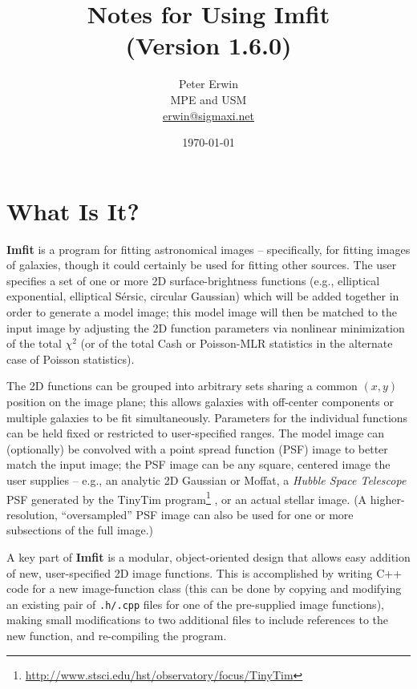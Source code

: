 \documentclass[10pt,a4paper,article]{memoir}
\newcommand{\imfit}{\textbf{Imfit}}
\newcommand{\Imfit}{\textbf{Imfit}}
\newcommand{\chisquare}{\ensuremath{\chi^{2}}}
\newcommand{\versionnum}{1.6.0}
\begin{document}
\title{
  Notes for Using Imfit \\
  (Version \versionnum{})
}
\author{
  Peter Erwin\\
  MPE and USM\\
  \href{mailto:erwin@sigmaxi.net}{erwin@sigmaxi.net}
}
\date{\today}  %

\maketitle

\tableofcontents


\newpage

\chapter{What Is It?}

\Imfit{} is a program for fitting astronomical images -- specifically,
for fitting images of galaxies, though it could certainly be used for
fitting other sources. The user specifies a set of one or more 2D
surface-brightness functions (e.g., elliptical exponential, elliptical
S\'ersic, circular Gaussian) which will be added together in order to
generate a model image; this model image will then be matched to the
input image by adjusting the 2D function parameters via nonlinear
minimization of the total \chisquare{} (or of the total Cash or
Poisson-MLR statistics in the alternate case of Poisson statistics).

The 2D functions can be grouped into arbitrary sets sharing a common $(x,y)$
position on the image plane; this allows galaxies with off-center components
or multiple galaxies to be fit simultaneously. Parameters for the individual
functions can be held fixed or restricted to user-specified ranges. The
model image can (optionally) be convolved with a point spread
function (PSF) image to better match the input image; the PSF image can
be any square, centered image the user supplies -- e.g., an analytic 2D Gaussian
or Moffat, a \textit{Hubble Space Telescope} PSF generated by the TinyTim
program\footnote{\url{http://www.stsci.edu/hst/observatory/focus/TinyTim}} \citep{krist95}, 
or an actual stellar image. (A higher-resolution, ``oversampled'' PSF image
can also be used for one or more subsections of the full image.) 

A key part of \imfit{} is a modular, object-oriented design that allows easy
addition of new, user-specified 2D image functions. This is accomplished by
writing C++ code for a new image-function class (this can be done by copying and
modifying an existing pair of \texttt{.h/.cpp} files for one of the pre-supplied
image functions), making small modifications to two additional files to include
references to the new function, and re-compiling the program.
\end{document}
